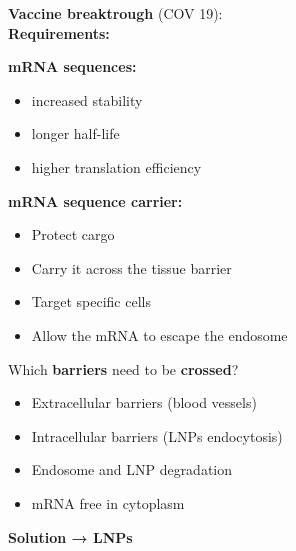 \textbf{Vaccine breaktrough} (COV 19):\\
\textbf{Requirements:}\\

\begin{minipage}
    {0.45\linewidth}
    \textbf{mRNA sequences:}
    \begin{itemize}
        \item increased stability
        \item longer half-life
        \item higher translation efficiency
    \end{itemize}
    \vspace{5mm}
\end{minipage}
\begin{minipage}
    {0.45\linewidth}
    \textbf{mRNA sequence carrier:}
    \begin{itemize}
        \item Protect cargo
        \item Carry it across the tissue barrier
        \item Target specific cells
        \item Allow the mRNA to escape the endosome
    \end{itemize}
\end{minipage}

Which \textbf{barriers} need to be \textbf{crossed}?
\begin{itemize}
    \item Extracellular barriers (blood vessels)
    \item Intracellular barriers (LNPs endocytosis)
    \item Endosome and LNP degradation
    \item mRNA free in cytoplasm
\end{itemize}

\hfill \textbf{Solution → LNPs}







